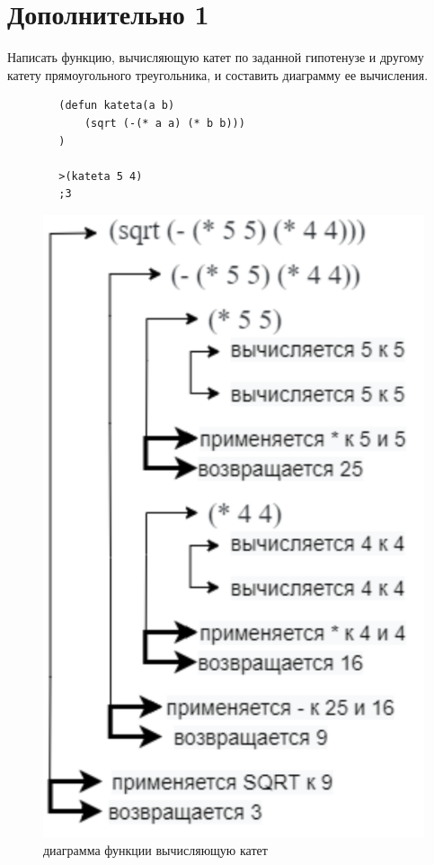 \documentclass[a4paper, 12pt]{article}
\begin{document}
\section*{Дополнительно 1}
Написать функцию, вычисляющую катет по заданной гипотенузе и другому катету прямоугольного треугольника, и составить диаграмму ее вычисления.
\begin{lstlisting}
		(defun kateta(a b)
			(sqrt (-(* a a) (* b b)))
		)
		
		>(kateta 5 4)
		;3
\end{lstlisting}
\begin{figure}[h!]
	\centering \includegraphics[scale=0.8]{dop1}
	\centering\caption{диаграмма функции вычисляющую катет}
\end{figure}
\end{document}

